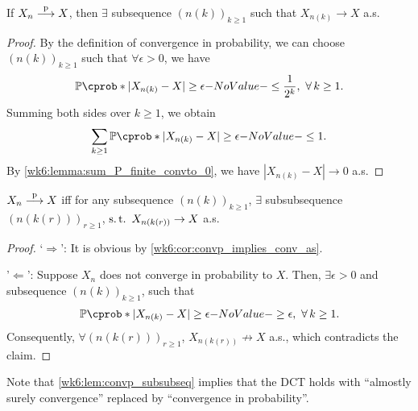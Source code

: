 \documentclass[12pt]{article}
\begin{document}
%
\begin{Corollary} \label{wk6:cor:convp_implies_conv_as}
If $X_n \stackrel{\mathrm{p}}{\longrightarrow} X$, then $\exists$ subsequence $(n(k))_{k\geq1}$ such that $X_{n(k)} \to X$ a.s.
\end{Corollary}
\begin{proof}
By the definition of convergence in probability, we can choose $(n(k))_{k\geq1}$ such that $\forall \epsilon > 0$, we have
\begin{align*}
\P(|X_{n(k)} - X| \geq \epsilon) \leq \frac{1}{2^k},\ \forall k \geq 1.
\end{align*}
Summing both sides over $k \geq 1$, we obtain
\begin{align*}
\sum_{k \geq 1} \P(|X_{n(k)} - X| \geq \epsilon) \leq 1.
\end{align*}
By \cref{wk6:lemma:sum_P_finite_convto_0}, we have $|X_{n(k)} - X| \to 0$ a.s.
\end{proof}
%
\begin{Lemma}\label{wk6:lem:convp_subsubseq}
$X_n \stackrel{\mathrm{p}}{\longrightarrow} X$ iff for any subsequence $\left(n(k)\right)_{k \geq 1}$, $\exists$ subsubsequence $\left(n\left(k(r)\right)\right)_{r \geq 1}$, $\st X_{n \left(k(r)\right)} \to X$ a.s.
\end{Lemma}
\begin{proof}
`$\Rightarrow$': It is obvious by \cref{wk6:cor:convp_implies_conv_as}. 

'$\Leftarrow$': Suppose $X_n$ does not converge in probability to $X$. Then, $\exists \epsilon > 0$ and subsequence $\left(n(k)\right)_{k \geq 1}$, such that
\begin{align*}
\P(|X_{n(k)} -X| \geq \epsilon) \geq \epsilon,\ \forall k \geq 1.
\end{align*}
Consequently, $\forall \left(n\left(k(r)\right)\right)_{r \geq 1}$, $X_{n \left(k(r)\right)} \not\to X$ a.s., which contradicts the claim.
\end{proof}
Note that \cref{wk6:lem:convp_subsubseq} implies that the DCT holds with ``almostly surely convergence'' replaced by ``convergence in probability''.
\end{document}
